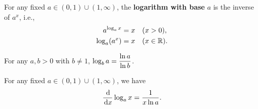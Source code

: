 \newpage

\begin{definition}
For any fixed $a\in (0,1)\cup (1,\infty)$, the \textbf{logarithm with base} $a$ is the inverse of $a^x$, i.e.,
\begin{align*}
a^{\log_a x } &= x \quad (x>0),\\
\log_a(a^x) &= x\quad (x\in\mathbb R).
\end{align*}
\end{definition}

\begin{theorem}
For any $a,b>0$ with $b\ne 1$, $\log_ba = \displaystyle\frac{\ln a}{\ln b}$.
\end{theorem}

\begin{corollary}
For any fixed $a\in (0,1)\cup (1,\infty)$, we have
\begin{equation*}
\frac{\mkern 2mu \mathrm{d} }{\mkern 2mu \mathrm{d} x}\log_a x = \frac{1}{x\ln a}.
\end{equation*}
\end{corollary}

\ifdefined\SOLUTION
{}
\else
\fi
